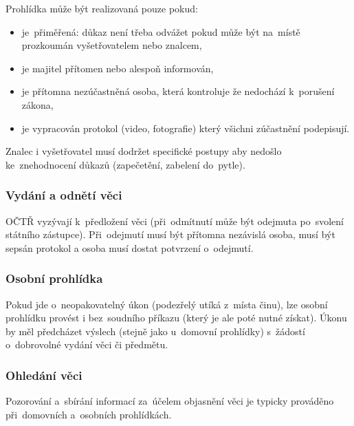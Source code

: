 Prohlídka může být realizovaná pouze pokud:
\vspace*{-1em}\begin{itemize}
\item je~přiměřená: důkaz není třeba odvážet pokud může být na~místě prozkoumán vyšetřovatelem nebo znalcem,
\item je majitel přítomen nebo alespoň informován,
\item je přítomna nezúčastněná osoba, která kontroluje že nedochází k~porušení zákona,
\item je vypracován protokol (video, fotografie) který všichni zúčastnění podepisují.
\end{itemize}

Znalec i vyšetřovatel musí dodržet specifické postupy aby nedošlo ke~znehodnocení důkazů (zapečetění, zabelení do~pytle).

\subsubsection{Vydání a odnětí věci}

OČTŘ vyzývají k~předložení věci (při~odmítnutí může být odejmuta po~svolení státního zástupce).
Při~odejmutí musí být přítomna nezávislá osoba, musí být sepsán protokol a osoba musí dostat potvrzení o~odejmutí.


\subsubsection{Osobní prohlídka}

Pokud jde o~neopakovatelný úkon (podezřelý utíká z~místa činu), lze osobní prohlídku provést i bez~soudního příkazu (který je ale poté nutné získat).
Úkonu by měl předcházet výslech (stejně jako u~domovní prohlídky) s~žádostí o~dobrovolné vydání věci či předmětu.


\subsubsection{Ohledání věci}

Pozorování a~sbírání informací za~účelem objasnění věci je typicky prováděno při~domovních a~osobních prohlídkách.

